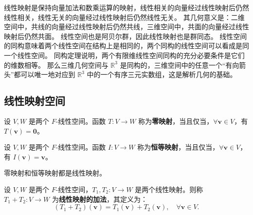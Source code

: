 \begin{note}
    线性映射是保持向量加法和数乘运算的映射，线性相关的向量经过线性映射后仍然线性相关，线性无关的向量经过线性映射后仍然线性无关。
    其几何意义是：二维空间中，共线的向量经过线性映射后仍然共线，三维空间中，共面的向量经过线性映射后仍然共面。
    线性空间也是阿贝尔群，因此线性映射也是群同态。
    线性空间的同构意味着两个线性空间在结构上是相同的，两个同构的线性空间可以看成是同一个线性空间。
    同构定理说明，两个有限维线性空间同构的充分必要条件是它们的维数相等。
    那么三维几何空间与 $\mathbb{R}^3$ 是同构的，三维空间中的任意一个“有向箭头”都可以唯一地对应到 $\mathbb{R}^3$ 中的一个有序三元实数组，这是解析几何的基础。
\end{note}
\vspace{1em}

\subsection{线性映射空间}

\begin{definition}
    设 $V,W$ 是两个 $F$-线性空间。函数 $T:V\to W$ 称为\textbf{零映射}，当且仅当，$\forall \mathbf{v}\in V $，有 $ T(\mathbf{v}) = \mathbf{0} $。
    \label{def:zero_map}
\end{definition}

\begin{definition}
    设 $V,W$ 是两个 $F$-线性空间。函数 $I:V\to W$ 称为\textbf{恒等映射}，当且仅当，$\forall \mathbf{v}\in V $，有 $ I(\mathbf{v}) = \mathbf{v} $。
    \label{def:identity_map}
\end{definition}

\begin{proposition}
    零映射和恒等映射都是线性映射。
\end{proposition}

\begin{definition}[线性映射的加法]
    设 $V,W$ 是两个 $F$-线性空间，$T_1,T_2:V\to W$ 是两个线性映射。则称 $T_1+T_2:V\to W$ 为\textbf{线性映射的加法}，其定义为：
    \[
        (T_1+T_2)(\mathbf{v}) = T_1(\mathbf{v}) + T_2(\mathbf{v}), \quad \forall \mathbf{v}\in V.
    \]
\end{definition}

